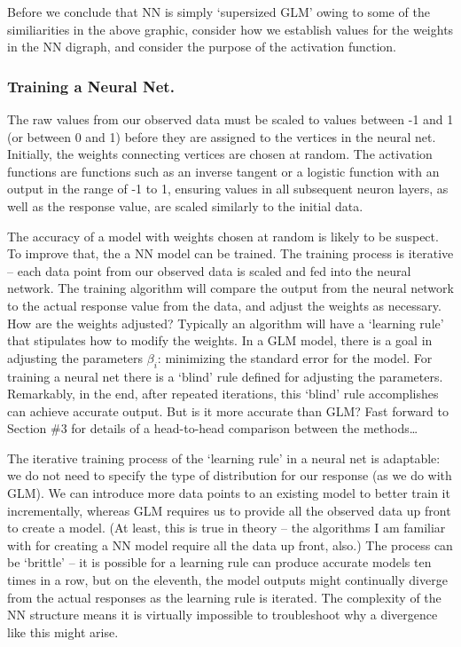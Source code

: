 \documentclass[12pt]{article}\usepackage[]{graphicx}\usepackage[]{color}
\begin{document}

Before we conclude that NN is simply `supersized GLM' owing to some of the similiarities in the above graphic, consider how we establish values for
the weights in the NN digraph, and consider the purpose of the activation function.

	\subsubsection{Training a Neural Net.}
The raw values from our observed data must be scaled to values between -1 and 1 (or between 0 and 1) before they are assigned to the vertices in 
the neural net.  Initially, the weights connecting vertices are chosen at random.  The activation functions are functions such as an inverse 
tangent or a logistic function with an output in the range of -1 to 1, ensuring values in all subsequent neuron layers, as well as the response 
value, are scaled similarly to the initial data.

The accuracy of a model with weights chosen at random is likely to be suspect.  To improve that, the a NN model can be trained.  The training
process is iterative -- each data point from our observed data is scaled and fed into the neural network.  The training algorithm will compare the
output from the neural network to the actual response value from the data, and adjust the weights as necessary.  How are the weights adjusted?  
Typically an algorithm will have a `learning rule' that stipulates how to modify the weights.  In a GLM model, there is a goal in adjusting the
parameters $\beta_i$: minimizing the standard error for the model.  For training a neural net there is a `blind' rule defined for adjusting the parameters.  Remarkably, in the end, after repeated iterations, this `blind' rule accomplishes can achieve accurate output.  But is it more accurate than GLM?  Fast forward to Section \#3 for details of a head-to-head comparison between the methods\dots

The iterative training process of the `learning rule' in a neural net is adaptable:  we do not need to specify the type of
distribution for our response (as we do with GLM).  We can introduce more data points to an existing model to better train it incrementally,
whereas GLM requires us to provide all the observed data up front to create a model.  (At least, this is true in theory -- the algorithms I am
familiar with for creating a NN model require all the data up front, also.)  The process can be `brittle' -- it is possible for a learning rule can produce accurate
models ten times in a row, but on the eleventh, the model outputs might continually diverge from the actual responses as the learning rule is iterated.  
The complexity of the NN structure means it is virtually impossible to troubleshoot why a divergence like this might arise.
\end{document}
